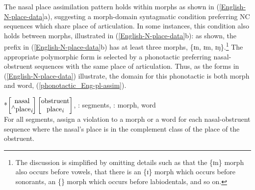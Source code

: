 The nasal place assimilation pattern holds within morphs as shown in  (\ref{English-N-place-data}a), suggesting a morph-domain syntagmatic condition preferring NC sequences which share place of articulation. In some instances, this condition also holds between morphs, illustrated in  (\ref{English-N-place-data}b): as shown, the prefix in (\ref{English-N-place-data}b) has at least three morphs, \{ɪn, ɪm, ɪŋ\}.\footnote{The discussion is simplified by omitting details such as that the \{ɪn\} morph also occurs before vowels, that there is an \{ɪ\} morph which occurs before sonorants, an \{\} morph which occurs before labiodentals, and so on.} The appropriate polymorphic form is selected by a phonotactic preferring nasal-obstruent sequences with the same place of articulation. Thus, as the forms in (\ref{English-N-place-data}) illustrate, the domain for this phonotactic is both morph and word,  (\ref{phonotactic_Eng-pl-assim}).


\begin{example}  \label{phonotactic_Eng-pl-assim}\ee
*$\begin{bmatrix}\textrm{nasal}\\\textrm{\ensuremath{^{\textrm{\footnotesize{$\wedge$}}}}place\ensuremath{_{\textrm{\footnotesize{\it i}}}}}\end{bmatrix} \begin{bmatrix}\textrm{obstruent}\\\textrm{place\ensuremath{_{\textrm{\footnotesize{\it i}}}}}\end{bmatrix}$, \tier: segments, \dom: morph, word\smallskip\\
For all segments, assign a violation to a morph or a word for each nasal-obstruent sequence where the nasal's place is in the complement class of the place of the obstruent.
\end{example}

